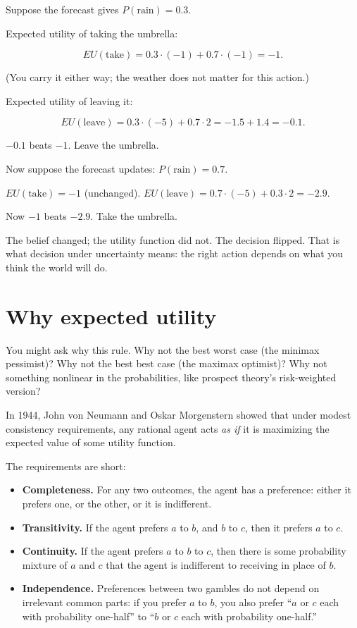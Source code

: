 Suppose the forecast gives $P(\text{rain}) = 0.3$.

Expected utility of taking the umbrella:

$$EU(\text{take}) = 0.3 \cdot (-1) + 0.7 \cdot (-1) = -1.$$

(You carry it either way; the weather does not matter for this action.)

Expected utility of leaving it:

$$EU(\text{leave}) = 0.3 \cdot (-5) + 0.7 \cdot 2 = -1.5 + 1.4 = -0.1.$$

$-0.1$ beats $-1$. Leave the umbrella.

Now suppose the forecast updates: $P(\text{rain}) = 0.7$.

$EU(\text{take}) = -1$ (unchanged).
$EU(\text{leave}) = 0.7 \cdot (-5) + 0.3 \cdot 2 = -2.9$.

Now $-1$ beats $-2.9$. Take the umbrella.

The belief changed; the utility function did not. The decision flipped. That is what decision under uncertainty means: the right action depends on what you think the world will do.

\section*{Why expected utility}

You might ask why this rule. Why not the best worst case (the minimax pessimist)? Why not the best best case (the maximax optimist)? Why not something nonlinear in the probabilities, like prospect theory's risk-weighted version?

In 1944, John von Neumann and Oskar Morgenstern showed that under modest consistency requirements, any rational agent acts \emph{as if} it is maximizing the expected value of some utility function.

The requirements are short:

\begin{itemize}
\item \textbf{Completeness.} For any two outcomes, the agent has a preference: either it prefers one, or the other, or it is indifferent.
\item \textbf{Transitivity.} If the agent prefers $a$ to $b$, and $b$ to $c$, then it prefers $a$ to $c$.
\item \textbf{Continuity.} If the agent prefers $a$ to $b$ to $c$, then there is some probability mixture of $a$ and $c$ that the agent is indifferent to receiving in place of $b$.
\item \textbf{Independence.} Preferences between two gambles do not depend on irrelevant common parts: if you prefer $a$ to $b$, you also prefer ``$a$ or $c$ each with probability one-half'' to ``$b$ or $c$ each with probability one-half.''
\end{itemize}

